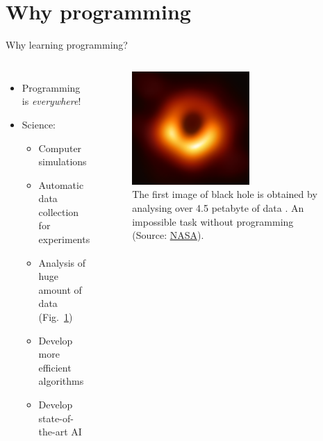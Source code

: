 \documentclass[10pt,xcolor={table,dvipsnames},t]{beamer}
\begin{document}
\section{Why programming}
\begin{frame} {Why learning programming?}
  \begin{columns}
    \begin{itemize}
      \item Programming is \textit{everywhere}!
      \item Science:
      \begin{itemize}
        \item Computer simulations
        \item Automatic data collection for experiments 
        \item Analysis of huge amount of data \\(Fig.~\ref{fig:eht_blackhole})
        \item Develop more efficient algorithms
        \item Develop state-of-the-art AI 
      \end{itemize}
    \end{itemize}

    \begin{figure}
      \includegraphics[width=0.6\textwidth]{img/blackhole.png}
      \caption{The first image of black hole is obtained by analysing over 4.5 petabyte of data \cite{westerndigital:EHT_blackhole}. An impossible task without programming (Source: \href{https://www.nasa.gov/mission_pages/chandra/news/black-hole-image-makes-history}{NASA}).}
      \label{fig:eht_blackhole}
    \end{figure}
  \end{columns}
  
\end{frame}
\end{document}
